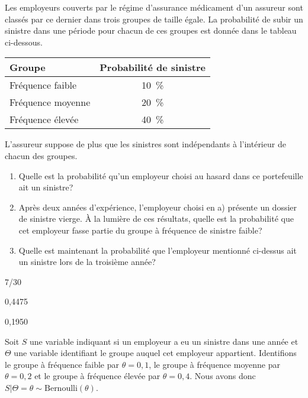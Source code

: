 \begin{exercice}
  Les employeurs couverts par le régime d'assurance médicament d'un
  assureur sont classés par ce dernier dans trois groupes de taille
  égale. La probabilité de subir un sinistre dans une période pour
  chacun de ces groupes est donnée dans le tableau ci-dessous.
  \begin{center}
    \begin{tabular}{lc}
      \toprule
      Groupe  & Probabilité de sinistre \\
      \midrule
      Fréquence faible    & 10~\% \\
      Fréquence moyenne   & 20~\% \\
      Fréquence élevée    & 40~\% \\
      \bottomrule
    \end{tabular}
  \end{center}
  L'assureur suppose de plus que les sinistres sont indépendants à
  l'intérieur de chacun des groupes.
  \begin{enumerate}
  \item Quelle est la probabilité qu'un employeur choisi au hasard
    dans ce portefeuille ait un sinistre?
  \item Après deux années d'expérience, l'employeur choisi en a)
    présente un dossier de sinistre vierge. À la lumière de ces
    résultats, quelle est la probabilité que cet employeur fasse
    partie du groupe à fréquence de sinistre faible?
  \item Quelle est maintenant la probabilité que l'employeur mentionné
    ci-dessus ait un sinistre lors de la troisième année?
  \end{enumerate}
  \begin{rep}
    \begin{inparaenum}
    \item 7/30
    \item 0,4475
    \item 0,1950
    \end{inparaenum}
  \end{rep}
  \begin{sol}
    Soit $S$ une variable indiquant si un employeur a eu un sinistre
    dans une année et $\Theta$ une variable identifiant le groupe
    auquel cet employeur appartient. Identifions le groupe à fréquence
    faible par $\theta = 0,1$, le groupe à fréquence moyenne par
    $\theta = 0,2$ et le groupe à fréquence élevée par $\theta = 0,4$.
    Nous avons donc $S|\Theta = \theta \sim \text{Bernoulli}(\theta)$.

\end{sol}
\end{exercice}

